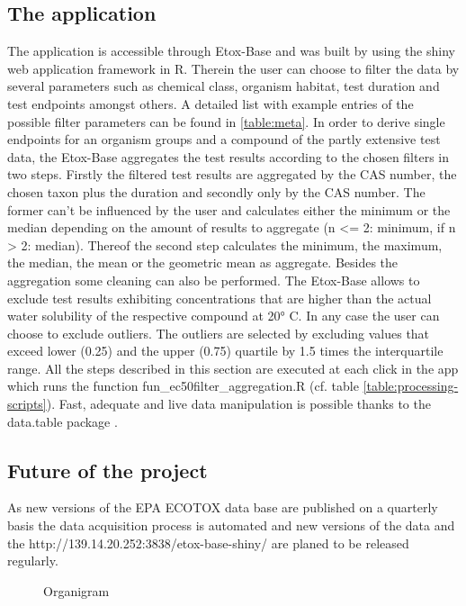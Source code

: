 \documentclass[english]{article}
\newcommand{\etoxbase}{Etox-Base}
\newcommand{\epa}{EPA ECOTOX data base}
\newcommand{\app}{http://139.14.20.252:3838/etox-base-shiny/}
\begin{document}
\subsection*{The application}
The application is accessible through \etoxbase{} and was built by using the shiny web application framework \citep{chang_shiny_2018} in R. Therein the user can choose to filter the data by several parameters such as chemical class, organism habitat, test duration and test endpoints amongst others. A detailed list with example entries of the possible filter parameters can be found in \ref{table:meta}. In order to derive single endpoints for an organism groups and a compound of the partly extensive test data, the \etoxbase{} aggregates the test results according to the chosen filters in two steps. Firstly the filtered test results are aggregated by the CAS number, the chosen taxon plus the duration and secondly only by the CAS number. The former can't be influenced by the user and calculates either the minimum or the median depending on the amount of results to aggregate (n <= 2: minimum, if n > 2: median). Thereof the second step calculates the minimum, the maximum, the median, the mean or the geometric mean as aggregate. Besides the aggregation some cleaning can also be performed. The \etoxbase{} allows to exclude test results exhibiting concentrations that are higher than the actual water solubility of the respective compound at \ang{20} C. In any case the user can choose to exclude outliers. The outliers are selected by excluding values that exceed lower (0.25) and the upper (0.75) quartile by 1.5 times the interquartile range. All the steps described in this section are executed at each click in the app which runs the function fun\_ec50filter\_aggregation.R (cf. table \ref{table:processing-scripts}). Fast, adequate and live data manipulation is possible thanks to the data.table package \citep{dowle_data.table_2018}.

\subsection*{Future of the project}
As new versions of the \epa{} are published on a quarterly basis the data acquisition process is automated and new versions of the data and the \app{} are planed to be released regularly.


\begin{figure}
    
    \caption{Organigram}
    \label{fig:organigram}
\end{figure}
\end{document}

